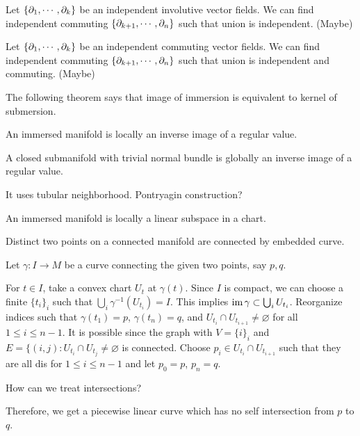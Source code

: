 \documentclass[a4paper]{article}
\begin{document}
\begin{prop}
Let $\{\pd_1,\cdots,\pd_k\}$ be an independent involutive vector fields.
We can find independent commuting $\{\pd_{k+1},\cdots,\pd_n\}$ such that union is independent.
(Maybe)
\end{prop}
\begin{prop}
Let $\{\pd_1,\cdots,\pd_k\}$ be an independent commuting vector fields.
We can find independent commuting $\{\pd_{k+1},\cdots,\pd_n\}$ such that union is independent and commuting.
(Maybe)
\end{prop}

\bigskip



The following theorem says that image of immersion is equivalent to kernel of submersion.
\begin{prop}
An immersed manifold is locally an inverse image of a regular value.
\end{prop}

\begin{prop}
A closed submanifold with trivial normal bundle is globally an inverse image of a regular value.
\end{prop}
\begin{pf}
It uses tubular neighborhood.
Pontryagin construction?
\end{pf}

\begin{prop}
An immersed manifold is locally a linear subspace in a chart.
\end{prop}

\begin{prop}
Distinct two points on a connected manifold are connected by embedded curve.
\end{prop}
\begin{pf}
Let $\gamma:I\to M$ be a curve connecting the given two points, say $p,q$.

For $t\in I$, take a convex chart $U_t$ at $\gamma(t)$.
Since $I$ is compact, we can choose a finite $\{t_i\}_i$ such that $\bigcup_i\gamma^{-1}(U_{t_i})=I$.
This implies $\operatorname{im}\gamma\subset\bigcup_iU_{t_i}$.
Reorganize indices such that $\gamma(t_1)=p$, $\gamma(t_n)=q$, and $U_{t_i}\cap U_{t_{i+1}}\ne\varnothing$ for all $1\le i\le n-1$.
It is possible since the graph with $V=\{i\}_i$ and $E=\{(i,j):U_{t_i}\cap U_{t_j}\ne\varnothing$ is connected.
Choose $p_i\in U_{t_i}\cap U_{t_{i+1}}$ such that they are all dis for $1\le i\le n-1$ and let $p_0=p$, $p_n=q$.

How can we treat intersections?

Therefore, we get a piecewise linear curve which has no self intersection from $p$ to $q$.

\end{pf}
\end{document}
